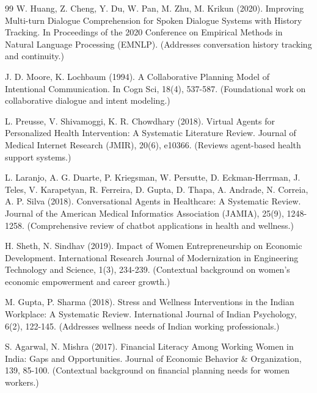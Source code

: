 \documentclass[oneside,a4paper,12pt]{report}
\begin{document}
\begin{thebibliography}{99}
 W. Huang, Z. Cheng, Y. Du, W. Pan, M. Zhu, M. Krikun (2020). Improving Multi-turn Dialogue Comprehension for Spoken Dialogue Systems with History Tracking. In Proceedings of the 2020 Conference on Empirical Methods in Natural Language Processing (EMNLP). (Addresses conversation history tracking and continuity.)
\vspace{2mm}

 J. D. Moore, K. Lochbaum (1994). A Collaborative Planning Model of Intentional Communication. In Cogn Sci, 18(4), 537-587. (Foundational work on collaborative dialogue and intent modeling.)
\vspace{2mm}

 L. Preusse, V. Shivamoggi, K. R. Chowdhary (2018). Virtual Agents for Personalized Health Intervention: A Systematic Literature Review. Journal of Medical Internet Research (JMIR), 20(6), e10366. (Reviews agent-based health support systems.)
\vspace{2mm}

 L. Laranjo, A. G. Duarte, P. Kriegsman, W. Persutte, D. Eckman-Herrman, J. Teles, V. Karapetyan, R. Ferreira, D. Gupta, D. Thapa, A. Andrade, N. Correia, A. P. Silva (2018). Conversational Agents in Healthcare: A Systematic Review. Journal of the American Medical Informatics Association (JAMIA), 25(9), 1248-1258. (Comprehensive review of chatbot applications in health and wellness.)
\vspace{2mm}

 H. Sheth, N. Sindhav (2019). Impact of Women Entrepreneurship on Economic Development. International Research Journal of Modernization in Engineering Technology and Science, 1(3), 234-239. (Contextual background on women's economic empowerment and career growth.)
\vspace{2mm}

 M. Gupta, P. Sharma (2018). Stress and Wellness Interventions in the Indian Workplace: A Systematic Review. International Journal of Indian Psychology, 6(2), 122-145. (Addresses wellness needs of Indian working professionals.)
\vspace{2mm}

 S. Agarwal, N. Mishra (2017). Financial Literacy Among Working Women in India: Gaps and Opportunities. Journal of Economic Behavior \& Organization, 139, 85-100. (Contextual background on financial planning needs for women workers.)
\vspace{2mm}


\end{thebibliography}
\end{document}
